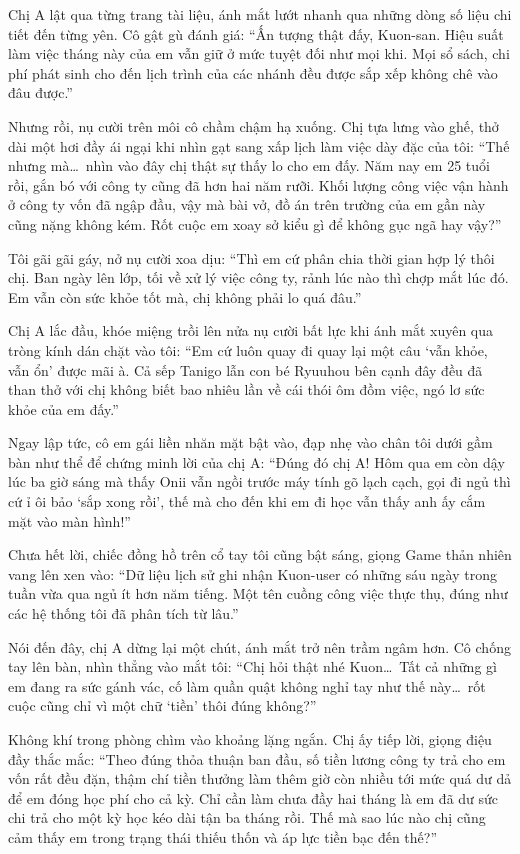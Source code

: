 \documentclass[../main.tex]{subfiles}
\begin{document}
Chị A lật qua từng trang tài liệu, ánh mắt lướt nhanh qua những dòng số liệu chi tiết đến từng yên. Cô gật gù đánh giá: ``Ấn tượng thật đấy, Kuon-san. Hiệu suất làm việc tháng này của em vẫn giữ ở mức tuyệt đối như mọi khi. Mọi sổ sách, chi phí phát sinh cho đến lịch trình của các nhánh đều được sắp xếp không chê vào đâu được.''

Nhưng rồi, nụ cười trên môi cô chầm chậm hạ xuống. Chị tựa lưng vào ghế, thở dài một hơi đầy ái ngại khi nhìn gạt sang xấp lịch làm việc dày đặc của tôi: ``Thế nhưng mà\dots\ nhìn vào đây chị thật sự thấy lo cho em đấy. Năm nay em 25 tuổi rồi, gắn bó với công ty cũng đã hơn hai năm rưỡi. Khối lượng công việc vận hành ở công ty vốn đã ngập đầu, vậy mà bài vở, đồ án trên trường của em gần này cũng nặng không kém. Rốt cuộc em xoay sở kiểu gì để không gục ngã hay vậy?''

Tôi gãi gãi gáy, nở nụ cười xoa dịu: ``Thì em cứ phân chia thời gian hợp lý thôi chị. Ban ngày lên lớp, tối về xử lý việc công ty, rảnh lúc nào thì chợp mắt lúc đó. Em vẫn còn sức khỏe tốt mà, chị không phải lo quá đâu.''

Chị A lắc đầu, khóe miệng trồi lên nửa nụ cười bất lực khi ánh mắt xuyên qua tròng kính dán chặt vào tôi: ``Em cứ luôn quay đi quay lại một câu `vẫn khỏe, vẫn ổn' được mãi à. Cả sếp Tanigo lẫn con bé Ryuuhou bên cạnh đây đều đã than thở với chị không biết bao nhiêu lần về cái thói ôm đồm việc, ngó lơ sức khỏe của em đấy.''

Ngay lập tức, cô em gái liền nhăn mặt bật vào, đạp nhẹ vào chân tôi dưới gầm bàn như thể để chứng minh lời của chị A: ``Đúng đó chị A! Hôm qua em còn dậy lúc ba giờ sáng mà thấy Onii vẫn ngồi trước máy tính gõ lạch cạch, gọi đi ngủ thì cứ ỉ ôi bảo `sắp xong rồi', thế mà cho đến khi em đi học vẫn thấy anh ấy cắm mặt vào màn hình!''

Chưa hết lời, chiếc đồng hồ trên cổ tay tôi cũng bật sáng, giọng Game thản nhiên vang lên xen vào: ``Dữ liệu lịch sử ghi nhận Kuon-user có những sáu ngày trong tuần vừa qua ngủ ít hơn năm tiếng. Một tên cuồng công việc thực thụ, đúng như các hệ thống tôi đã phân tích từ lâu.''

Nói đến đây, chị A dừng lại một chút, ánh mắt trở nên trầm ngâm hơn. Cô chống tay lên bàn, nhìn thẳng vào mắt tôi: ``Chị hỏi thật nhé Kuon\dots\ Tất cả những gì em đang ra sức gánh vác, cố làm quần quật không nghỉ tay như thế này\dots\ rốt cuộc cũng chỉ vì một chữ `tiền' thôi đúng không?''

Không khí trong phòng chìm vào khoảng lặng ngắn. Chị ấy tiếp lời, giọng điệu đầy thắc mắc: ``Theo đúng thỏa thuận ban đầu, số tiền lương công ty trả cho em vốn rất đều đặn, thậm chí tiền thưởng làm thêm giờ còn nhiều tới mức quá dư dả để em đóng học phí cho cả kỳ. Chỉ cần làm chưa đầy hai tháng là em đã dư sức chi trả cho một kỳ học kéo dài tận ba tháng rồi. Thế mà sao lúc nào chị cũng cảm thấy em trong trạng thái thiếu thốn và áp lực tiền bạc đến thế?''
\end{document}
